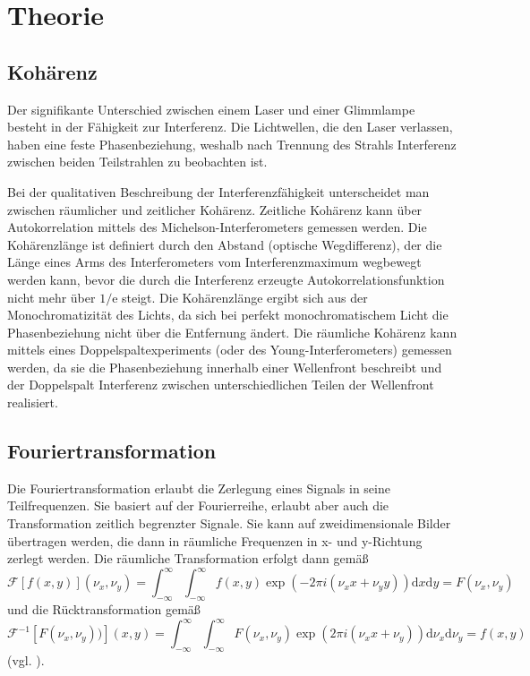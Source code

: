 \documentclass[
	a4paper,
	12pt,
	pagesize,
	ngerman
]{scrartcl}
\begin{document}
  \section{Theorie}


	\subsection{Kohärenz} %
	Der signifikante Unterschied zwischen einem Laser und einer Glimmlampe besteht in der Fähigkeit zur Interferenz.
	Die Lichtwellen, die den Laser verlassen, haben eine feste Phasenbeziehung, weshalb nach Trennung des Strahls Interferenz zwischen beiden Teilstrahlen zu beobachten ist.

	Bei der qualitativen Beschreibung der Interferenzfähigkeit unterscheidet man zwischen räumlicher und zeitlicher Kohärenz.
	Zeitliche Kohärenz kann über Autokorrelation mittels des Michelson-Interferometers gemessen werden.
	Die Kohärenzlänge ist definiert durch den Abstand (optische Wegdifferenz), der die Länge eines Arms des Interferometers vom Interferenzmaximum wegbewegt werden kann, bevor die durch die Interferenz erzeugte Autokorrelationsfunktion nicht mehr über $1/\text{e}$ steigt.
	Die Kohärenzlänge ergibt sich aus der Monochromatizität des Lichts, da sich bei perfekt monochromatischem Licht die Phasenbeziehung nicht über die Entfernung ändert.
	Die räumliche Kohärenz kann mittels eines Doppelspaltexperiments (oder des Young-Interferometers) gemessen werden, da sie die Phasenbeziehung innerhalb einer Wellenfront beschreibt und der Doppelspalt Interferenz zwischen unterschiedlichen Teilen der Wellenfront realisiert.
	\cite{Anleitung}

	\subsection{Fouriertransformation}
	Die Fouriertransformation erlaubt die Zerlegung eines Signals in seine Teilfrequenzen.
	Sie basiert auf der Fourierreihe, erlaubt aber auch die Transformation zeitlich begrenzter Signale.
	Sie kann auf zweidimensionale Bilder übertragen werden, die dann in räumliche Frequenzen in x- und y-Richtung zerlegt werden.
	Die räumliche Transformation erfolgt dann gemäß
	\begin{equation}
		\mathcal{F}[f(x,y)](\nu_x, \nu_y) = \int _{-\infty}^{\infty} \int^{\infty}_{-\infty} f(x,y) \exp (-2\pi i (\nu_x x + \nu_y y)) \mathrm{d} x \mathrm{d} y = F (\nu_x , \nu_y)
	\end{equation}
	und die Rücktransformation gemäß
	\begin{equation}
		\mathcal{F}^{-1}[F (\nu_x , \nu_y))](x, y) = \int _{-\infty}^{\infty} \int^{\infty}_{-\infty} F(\nu_x , \nu_y) \exp (2\pi i (\nu_x x + \nu_y )) \mathrm{d} \nu_x \mathrm{d} \nu_y = f (x , y)
	\end{equation}
	(vgl. \cite{Anleitung}).
\end{document}
